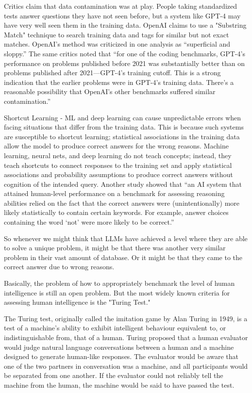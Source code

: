 Critics claim that data contamination was at play. People taking standardized tests answer questions they have not seen before, but a system like GPT-4 may have very well seen them in the training data. OpenAI claims to use a "Substring Match" technique to search training data and tags for similar but not exact matches. OpenAI’s method was criticized in one analysis as “superficial and sloppy.” The same critics noted that “for one of the coding benchmarks, GPT-4’s performance on problems published before 2021 was substantially better than on problems published after 2021—GPT-4’s training cutoff. This is a strong indication that the earlier problems were in GPT-4’s training data. There’s a reasonable possibility that OpenAI’s other benchmarks suffered similar contamination.”

Shortcut Learning - ML and deep learning can cause unpredictable errors when facing situations that differ from the training data. This is because such systems are susceptible to shortcut learning; statistical associations in the training data allow the model to produce correct answers for the wrong reasons. Machine learning, neural nets, and deep learning do not teach concepts; instead, they teach shortcuts to connect responses to the training set and apply statistical associations and probability assumptions to produce correct answers without cognition of the intended query. Another study showed that “an AI system that attained human-level performance on a benchmark for assessing reasoning abilities relied on the fact that the correct answers were (unintentionally) more likely statistically to contain certain keywords. For example, answer choices containing the word ‘not’ were more likely to be correct.”

So whenever we might think that LLMs have achieved a level where they are able to solve a unique problem, it might be that there was another very similar problem in their vast amount of database. Or it might be that they came to the correct answer due to wrong reasons.

Basically, the problem of how to appropriately benchmark the level of human intelligence is still an open problem. But the most widely known criteria for assessing human intelligence is the "Turing Test."

The Turing test, originally called the imitation game by Alan Turing in 1949, is a test of a machine's ability to exhibit intelligent behaviour equivalent to, or indistinguishable from, that of a human. Turing proposed that a human evaluator would judge natural language conversations between a human and a machine designed to generate human-like responses. The evaluator would be aware that one of the two partners in conversation was a machine, and all participants would be separated from one another. If the evaluator could not reliably tell the machine from the human, the machine would be said to have passed the test.

